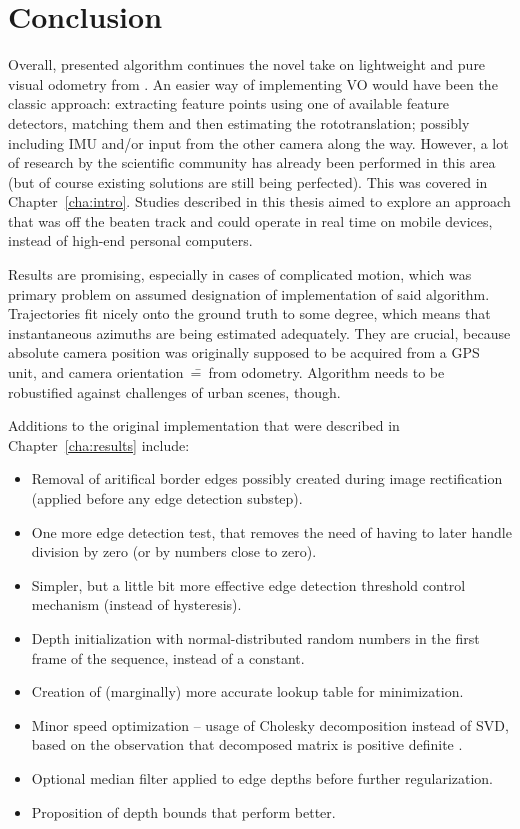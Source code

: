 \chapter{Conclusion}
\label{cha:conclusion}

Overall, presented algorithm continues the novel take on lightweight and pure visual odometry from \cite{jose2015realtime}. An easier way of implementing VO would have been the classic approach: extracting feature points using one of available feature detectors, matching them and then estimating the rototranslation; possibly including IMU and/or input from the other camera along the way. However, a lot of research by the scientific community has already been performed in this area (but of course existing solutions are still being perfected). This was covered in Chapter~\ref{cha:intro}. Studies described in this thesis aimed to explore an approach that was off the beaten track and could operate in real time on mobile devices, instead of high-end personal computers.

Results are promising, especially in cases of complicated motion, which was primary problem on assumed designation of implementation of said algorithm. Trajectories fit nicely onto the ground truth to some degree, which means that instantaneous azimuths are being estimated adequately. They are crucial, because absolute camera position was originally supposed to be acquired from a GPS unit, and camera orientation~\==~from odometry. Algorithm needs to be robustified against challenges of urban scenes, though.

Additions to the original implementation \cite{jose2015realtime} that were described in Chapter~\ref{cha:results} include:
\begin{itemize}
	\item Removal of aritifical border edges possibly created during image rectification (applied before any edge detection substep).
	\item One more edge detection test, that removes the need of having to later handle division by zero (or by numbers close to zero).
	\item Simpler, but a little bit more effective edge detection threshold control mechanism (instead of hysteresis).
	\item Depth initialization with normal-distributed random numbers in the first frame of the sequence, instead of a constant.
	\item Creation of (marginally) more accurate lookup table for minimization.
	\item Minor speed optimization -- usage of Cholesky decomposition instead of SVD, based on the observation that decomposed matrix is positive definite \cite{madsen2004methods}.
	\item Optional median filter applied to edge depths before further regularization.
	\item Proposition of depth bounds that perform better.
\end{itemize}



